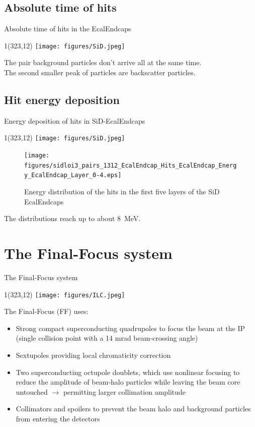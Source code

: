 \documentclass[xcolor={dvipsnames}]{beamer}
\newcommand{\sidlogo}{
  \setlength{\TPHorizModule}{1pt}
  \setlength{\TPVertModule}{1pt}
  \begin{textblock}{1}(323,12)
   \texttt{[image: figures/SiD.jpeg]}
  \end{textblock}
  }
\newcommand{\ilclogo}{
  \setlength{\TPHorizModule}{1pt}
  \setlength{\TPVertModule}{1pt}
  \begin{textblock}{1}(323,12)
   \texttt{[image: figures/ILC.jpeg]}
  \end{textblock}
}
\begin{document}
\subsection{Absolute time of hits}
\begin{frame}{Absolute time of hits in the EcalEndcaps}
\sidlogo
{}
The pair background particles don't arrive all at the same time.\\
The second smaller peak of particles are backscatter particles.
\end{frame} 

\subsection{Hit energy deposition}
\begin{frame}{Energy deposition of hits in SiD-EcalEndcaps}
\sidlogo
 \begin{figure}
 \centering
  \texttt{[image: figures/sidloi3\_pairs\_1312\_EcalEndcap\_Hits\_EcalEndcap\_Energy\_EcalEndcap\_Layer\_0-4.eps]}
 \caption{Energy distribution of the hits in the first five layers of the SiD EcalEndcaps}
 \end{figure}
The distributions reach up to about \SI{8}{\mega\electronvolt}.
\end{frame}

\section{The Final-Focus system}
\begin{frame}{The Final-Focus system}
 \ilclogo
 The Final-Focus (FF) uses:
\begin{itemize}
 \item Strong compact superconducting quadrupoles to focus the
beam at the IP (single collision point with a 14 mrad beam-crossing angle)
\item Sextupoles providing local chromaticity correction
\item Two superconducting octupole doublets, which use nonlinear
focusing to reduce the amplitude of beam-halo particles while leaving the beam core untouched $\rightarrow$ permitting larger collimation amplitude
\item Collimators and spoilers to prevent the beam halo and background particles from entering the detectors
\end{itemize}

\end{frame}
\end{document}
